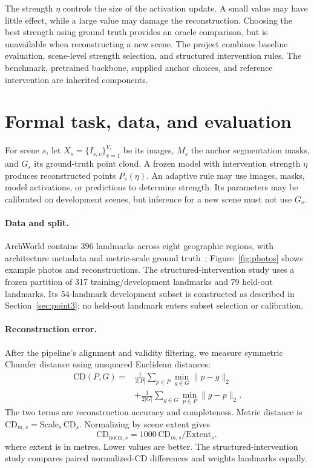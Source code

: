 \documentclass[sigconf,nonacm]{acmart}
\begin{document}
The strength $\eta$ controls the size of the activation update. A small value may have little effect, while a large value may damage the reconstruction. Choosing the best strength using ground truth provides an oracle comparison, but is unavailable when reconstructing a new scene. The project combines baseline evaluation, scene-level strength selection, and structured intervention rules. The benchmark, pretrained backbone, supplied anchor choices, and reference intervention are inherited components.

\section{Formal task, data, and evaluation}
For scene $s$, let $X_s=\{I_{s,v}\}_{v=1}^{V_s}$ be its images, $M_s$ the anchor segmentation masks, and $G_s$ its ground-truth point cloud. A frozen model with intervention strength $\eta$ produces reconstructed points $P_s(\eta)$. An adaptive rule may use images, masks, model activations, or predictions to determine strength. Its parameters may be calibrated on development scenes, but inference for a new scene must not use $G_s$.

\paragraph{Data and split.}
ArchWorld contains 396 landmarks across eight geographic regions, with architecture metadata and metric-scale ground truth~\cite{archworld}; Figure~\ref{fig:photos} shows example photos and reconstructions. The structured-intervention study uses a frozen partition of 317 training/development landmarks and 79 held-out landmarks. Its 54-landmark development subset is constructed as described in Section~\ref{sec:point3}; no held-out landmark enters subset selection or calibration.

\paragraph{Reconstruction error.}
After the pipeline's alignment and validity filtering, we measure symmetric Chamfer distance using unsquared Euclidean distances:
\begin{equation}
\begin{aligned}
\mathrm{CD}(P,G)={}&\frac{1}{2|P|}\sum_{p\in P}\min_{g\in G}\|p-g\|_2\\
&+\frac{1}{2|G|}\sum_{g\in G}\min_{p\in P}\|g-p\|_2.
\end{aligned}
\label{eq:cd}
\end{equation}
The two terms are reconstruction accuracy and completeness. Metric distance is $\mathrm{CD}_{m,s}=\mathrm{Scale}_s\,\mathrm{CD}_s$. Normalizing by scene extent gives
\begin{equation}
\mathrm{CD}_{\mathrm{norm},s}=1000\,\mathrm{CD}_{m,s}/\mathrm{Extent}_s,
\end{equation}
where extent is in metres. Lower values are better. The structured-intervention study compares paired normalized-CD differences and weights landmarks equally.
\end{document}
